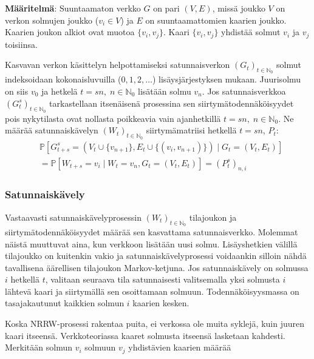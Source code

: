 \documentclass[finnish, 12pt, a4paper, sci, utf8, pdfa]{aaltothesis}
\newcommand{\N}{\mathbb{N}}
\newcommand*{\prob}{\mathbb{P}}
\begin{document}
\textbf{Määritelmä}: Suuntaamaton verkko $ G $ on pari $ (V, E) $, missä joukko $ V $ on verkon solmujen joukko (\( v_{i} \in V \)) ja $ E $ on suuntaamattomien kaarien joukko. Kaarien joukon alkiot ovat muotoa \( \{ v_{i}, v_{j} \} \). Kaari \( \{ v_{i}, v_{j} \} \) yhdistää solmut \( v_{i} \) ja \( v_{j} \) toisiinsa. 

\vspace{0.5cm}

Kasvavan verkon käsittelyn helpottamiseksi satunnaisverkon \( (G_{t})_{t \in \N_{0}} \) solmut indeksoidaan kokonaisluvuilla (\( 0, 1, 2, \ldots \)) lisäysjärjestyksen mukaan. Juurisolmu on siis \( v_{0} \) ja hetkelä \( t = sn, \; n \in \N_{0} \) lisätään solmu \( v_{n} \). Jos satunnaisverkkoa \( (G_{t}^{s})_{t \in \N_{0}} \) tarkastellaan itsenäisenä prosessina sen siirtymätodennäköisyydet pois nykytilasta ovat nollasta poikkeavia vain ajanhetkillä \( t = sn, \; n \in \N_{0} \). Ne määrää satunnaiskävelyn \( (W_{t})_{t \in \N_{0}} \) siirtymämatriisi hetkellä \( t = sn \), \( P_{t} \):
\begin{equation}
\begin{split}
   & \prob \left[ G_{t+s}^{s} = (V_{t} \cup \{ v_{n + 1} \}, E_{t} \cup \{ (v_{i}, v_{n + 1}) \}) \mid G_{t} = (V_{t}, E_{t}) \right] \\
   &= \prob \left[ W_{t+s} = v_{i} \mid W_{t} = v_{n}, G_{t} = (V_{t}, E_{t}) \right] = (P_{t}^{s})_{n,i}
\end{split}
\end{equation}

\subsubsection{Satunnaiskävely}

Vastaavasti satunnaiskävelyprosessin \( (W_{t})_{t \in \N_{0}} \) tilajoukon ja siirtymätodennäköisyydet määrää sen kasvattama satunnaisverkko. Molemmat näistä muuttuvat aina, kun verkkoon lisätään uusi solmu. Lisäyshetkien välillä tilajoukko on kuitenkin vakio ja satunnaiskävelyprosessi voidaankin silloin nähdä tavallisena äärellisen tilajoukon Markov-ketjuna. Jos satunnaiskävely on solmussa \( i \) hetkellä \( t \), valitaan seuraava tila satunnaisesti valitsemalla yksi solmusta \( i \) lähtevä kaari ja siirtymällä sen osoittamaan solmuun. Todennäköisyysmassa on tasajakautunut kaikkien solmun \( i \) kaarien kesken. 

Koska NRRW-prosessi rakentaa puita, ei verkossa ole muita syklejä, kuin juuren kaari itseensä. Verkkoteoriassa kaaret solmusta itseensä lasketaan kahdesti. Merkitään solmun \( v_{i} \) solmuun \( v_{j} \) yhdistävien kaarien määrää
\end{document}
